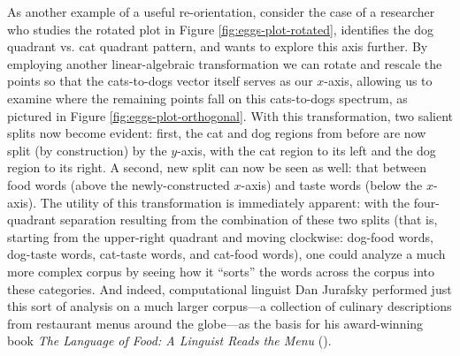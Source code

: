 \documentclass[11pt]{article}
\begin{document}
As another example of a useful re-orientation, consider the case of a researcher who studies the rotated plot in Figure \ref{fig:eggs-plot-rotated}, identifies the dog quadrant vs. cat quadrant pattern, and wants to explore this axis further. By employing another linear-algebraic transformation we can rotate and rescale the points so that the cats-to-dogs vector itself serves as our $x$-axis, allowing us to examine where the remaining points fall on this cats-to-dogs spectrum, as pictured in Figure \ref{fig:eggs-plot-orthogonal}. With this transformation, two salient splits now become evident: first, the cat and dog regions from before are now split (by construction) by the $y$-axis, with the cat region to its left and the dog region to its right. A second, new split can now be seen as well: that between food words (above the newly-constructed $x$-axis) and taste words (below the $x$-axis). The utility of this transformation is immediately apparent: with the four-quadrant separation resulting from the combination of these two splits (that is, starting from the upper-right quadrant and moving clockwise: dog-food words, dog-taste words, cat-taste words, and cat-food words), one could analyze a much more complex corpus by seeing how it ``sorts'' the words across the corpus into these categories. And indeed, computational linguist Dan Jurafsky performed just this sort of analysis on a much larger corpus---a collection of culinary descriptions from restaurant menus around the globe---as the basis for his award-winning book \textit{The Language of Food: A Linguist Reads the Menu} (\cite{jurafsky_language_2014}).
\end{document}
